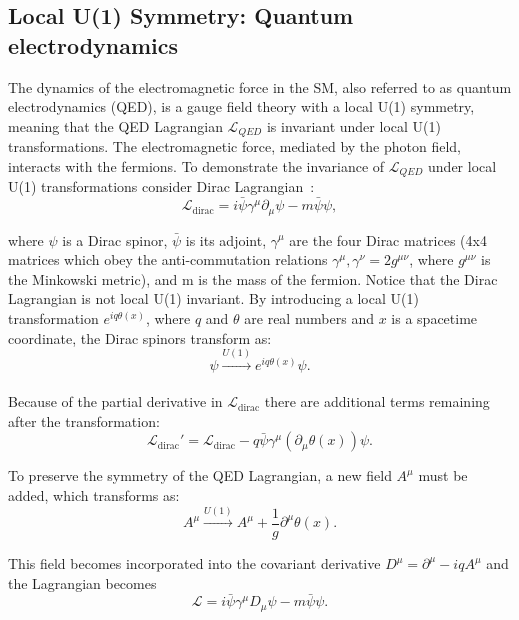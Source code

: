 \subsection{Local U(1) Symmetry: Quantum electrodynamics}

The dynamics of the electromagnetic force in the SM, also referred to as quantum electrodynamics (QED), is a gauge field theory with a local U(1) symmetry, meaning that the QED Lagrangian $\mathcal{L}_{QED}$ is invariant under local U(1) transformations. The electromagnetic force, mediated by the photon field, interacts with the fermions. To demonstrate the invariance of $\mathcal{L}_{QED}$ under local U(1) transformations consider Dirac Lagrangian~\cite{dirac,griffiths}:
\begin{equation}
    \mathcal{L}_{\mathrm{dirac}} = i\bar{\psi}\gamma^{\mu} \partial_{\mu}\psi - m\bar{\psi}\psi,
\end{equation}

\noindent where $\psi$ is a Dirac spinor, $\bar{\psi}$ is its adjoint, $\gamma^\mu$ are the four Dirac matrices (4x4 matrices which obey the anti-commutation relations ${\gamma^{\mu},\gamma^{\nu}} = 2g^{\mu\nu}$, where $g^{\mu\nu}$ is the Minkowski metric), and m is the mass of the fermion. Notice that the Dirac Lagrangian is not local U(1) invariant. By introducing a local U(1) transformation $e^{iq\theta(x)}$, where $q$ and $\theta$ are real numbers and $x$ is a spacetime coordinate, the Dirac spinors transform as:
\begin{equation}
    \psi \xrightarrow[]{U(1)} e^{iq\theta(x)}\psi.
\end{equation}

Because of the partial derivative in $\mathcal{L}_{\mathrm{dirac}}$ there are additional terms remaining after the transformation:
\begin{equation}
    \mathcal{L}_{\mathrm{dirac}}' = \mathcal{L}_{\mathrm{dirac}} - q\bar{\psi}\gamma^{\mu}(\partial_{\mu}\theta(x))\psi.
    \label{eqn:lagr_dirac_EM}
\end{equation}

To preserve the symmetry of the QED Lagrangian, a new field $A^{\mu}$ must be added, which transforms as:
\begin{equation}
    A^{\mu} \xrightarrow[]{U(1)} A^{\mu} + \frac{1}{g}\partial^{\mu}\theta(x).
\end{equation}

This field becomes incorporated into the covariant derivative $D^{\mu} = \partial^{\mu} - iqA^{\mu}$ and the Lagrangian becomes
\begin{equation}
    \mathcal{L} = i\bar{\psi}\gamma^{\mu}D_{\mu}\psi - m \bar{\psi}\psi.
\end{equation}

